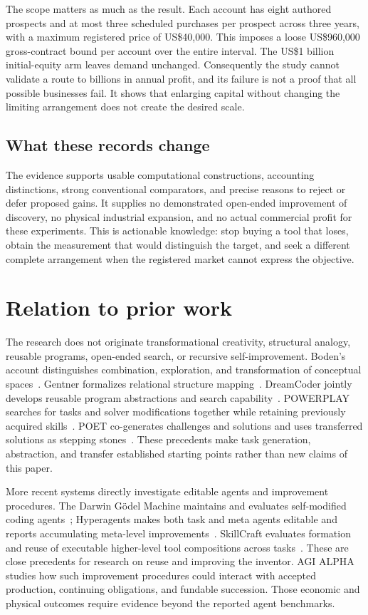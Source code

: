 \documentclass[10pt,a4paper]{article}
\begin{document}
The scope matters as much as the result. Each account has eight authored prospects and at most three scheduled purchases per prospect across three years, with a maximum registered price of US\$40,000. This imposes a loose US\$960,000 gross-contract bound per account over the entire interval. The US\$1 billion initial-equity arm leaves demand unchanged. Consequently the study cannot validate a route to billions in annual profit, and its failure is not a proof that all possible businesses fail. It shows that enlarging capital without changing the limiting arrangement does not create the desired scale.

\subsection{What these records change}

The evidence supports usable computational constructions, accounting distinctions, strong conventional comparators, and precise reasons to reject or defer proposed gains. It supplies no demonstrated open-ended improvement of discovery, no physical industrial expansion, and no actual commercial profit for these experiments. This is actionable knowledge: stop buying a tool that loses, obtain the measurement that would distinguish the target, and seek a different complete arrangement when the registered market cannot express the objective.

\section{Relation to prior work}\label{sec:related}

The research does not originate transformational creativity, structural analogy, reusable programs, open-ended search, or recursive self-improvement. Boden's account distinguishes combination, exploration, and transformation of conceptual spaces~\citep{boden}. Gentner formalizes relational structure mapping~\citep{gentner}. DreamCoder jointly develops reusable program abstractions and search capability~\citep{dreamcoder}. POWERPLAY searches for tasks and solver modifications together while retaining previously acquired skills~\citep{powerplay}. POET co-generates challenges and solutions and uses transferred solutions as stepping stones~\citep{poet}. These precedents make task generation, abstraction, and transfer established starting points rather than new claims of this paper.

More recent systems directly investigate editable agents and improvement procedures. The Darwin G\"odel Machine maintains and evaluates self-modified coding agents~\citep{dgm}; Hyperagents makes both task and meta agents editable and reports accumulating meta-level improvements~\citep{hyperagents}. SkillCraft evaluates formation and reuse of executable higher-level tool compositions across tasks~\citep{skillcraft}. These are close precedents for research on reuse and improving the inventor. AGI ALPHA studies how such improvement procedures could interact with accepted production, continuing obligations, and fundable succession. Those economic and physical outcomes require evidence beyond the reported agent benchmarks.
\end{document}
